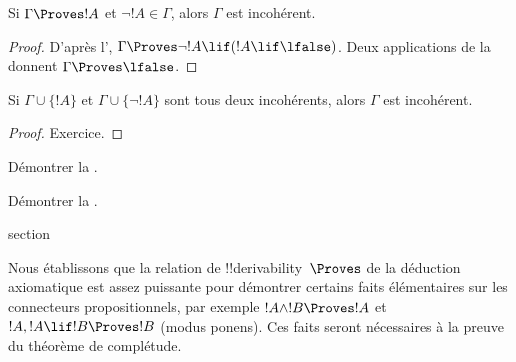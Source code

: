 \documentclass[11pt,a4paper,openany]{memoir}
\begin{document}
\begin{prop}
Si $\Gamma \Proves !A$ et $\lnot !A \in \Gamma$, alors $\Gamma$ est
incohérent.
\end{prop}

\begin{proof}
D'après l',
$\Gamma \Proves \lnot !A \lif (!A \lif \lfalse)$. Deux applications
de la  donnent $\Gamma \Proves \lfalse$.
\end{proof}

\begin{prop}
Si $\Gamma \cup \{!A\}$ et $\Gamma \cup \{\lnot !A\}$ sont tous deux
incohérents, alors $\Gamma$ est incohérent.
\end{prop}

\begin{proof}
Exercice.
\end{proof}

\begin{prob}
Démontrer la .
\end{prob}
\tagendprob

\begin{prob}
Démontrer la .
\end{prob}
\tagendprob


\endgroup



\begingroup
\expandafter\def\csname ol@sectioncs\endcsname{section}
\def\olfilename{provability-propositional}


      {}
      {}


\begin{explain}
Nous établissons que la relation de !!{derivability}~$\Proves$ de la
déduction axiomatique est assez puissante pour démontrer certains faits
élémentaires sur les connecteurs propositionnels, par exemple
$!A \land !B \Proves !A$ et
$!A, !A \lif !B \Proves !B$ (modus ponens). Ces faits seront
nécessaires à la preuve du théorème de complétude.
\end{explain}
\end{document}
